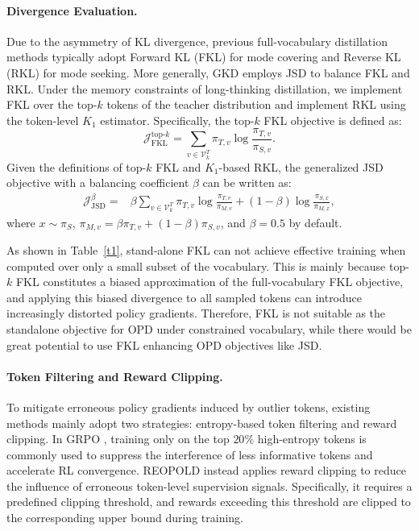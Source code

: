 \documentclass{article} %
\renewcommand{\cite}[1]{\citep{#1}}
\begin{document}
\paragraph{Divergence Evaluation.}
Due to the asymmetry of KL divergence, previous full-vocabulary distillation methods typically adopt Forward KL (FKL) for mode covering and Reverse KL (RKL) for mode seeking. More generally, GKD \cite{agarwal2024onpolicy} employs JSD to balance FKL and RKL. Under the memory constraints of long-thinking distillation, we implement FKL over the top-$k$ tokens of the teacher distribution and implement RKL using the token-level $K_1$ estimator. Specifically, the top-$k$ FKL objective is defined as:
\begin{equation}
    \mathcal{J}_{\mathrm{FKL}}^{\mathrm{top}\text{-}k}
    =
    \sum_{v \in \mathcal{V}^{T}_{k}}
    \pi_{T,v}
    \log
    \frac{\pi_{T,v}}{\pi_{S,v}} .
\end{equation}
Given the definitions of top-$k$ FKL and $K_1$-based RKL, 
the generalized JSD objective with a balancing coefficient $\beta$ 
can be written as:
\begin{equation}
\begin{aligned}
    \mathcal{J}_{\mathrm{JSD}}^{\beta}
    =
    {}&
    \beta
    \sum_{v \in \mathcal{V}^{T}_{k}}
    \pi_{T,v}
    \log
    \frac{\pi_{T,v}}{\pi_{M,v}}
    +
    (1-\beta)
    \log
    \frac{\pi_{S,x}}{\pi_{M,x}},
\end{aligned}
\end{equation}
where $x \sim \pi_S$, 
$\pi_{M,v} = \beta \pi_{T,v} + (1-\beta)\pi_{S,v}$, 
and $\beta=0.5$ by default.

As shown in Table~\ref{t1}, stand-alone FKL can not achieve effective training when computed over only a small subset of the vocabulary. This is mainly because top-$k$ FKL constitutes a biased approximation of the full-vocabulary FKL objective, and applying this biased divergence to all sampled tokens can introduce increasingly distorted policy gradients. Therefore, FKL is not suitable as the standalone objective for OPD under constrained vocabulary, while there would be great potential to use FKL enhancing OPD objectives like JSD.


\paragraph{Token Filtering and Reward Clipping.}
To mitigate erroneous policy gradients induced by outlier tokens, existing methods mainly adopt two strategies: entropy-based token filtering and reward clipping. In GRPO \cite{shao2024deepseekmath}, training only on the top $20\%$ high-entropy tokens is commonly used to suppress the interference of less informative tokens and accelerate RL convergence. REOPOLD \cite{ko2026scaling} instead applies reward clipping to reduce the influence of erroneous token-level supervision signals. Specifically, it requires a predefined clipping threshold, and rewards exceeding this threshold are clipped to the corresponding upper bound during training.
\end{document}
